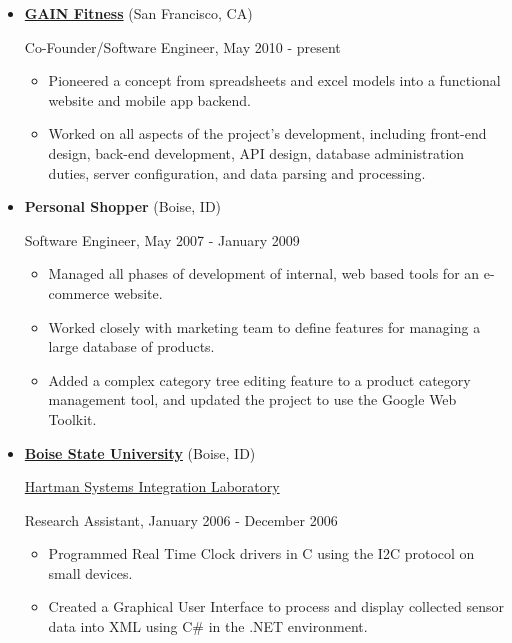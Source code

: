 \documentclass{article}
\begin{document}
\begin{itemize}%
\item \textbf{\href{http://gainfitness.com}{GAIN Fitness}} (San Francisco, CA)

Co-Founder/Software Engineer, May 2010 - present

\begin{itemize}%
\item Pioneered a concept from spreadsheets and excel models into a functional website and mobile app backend.
\item Worked on all aspects of the project’s development, including front-end design, back-end development, API design, database administration duties, server configuration, and data parsing and processing.

\end{itemize}


\end{itemize}
\begin{itemize}%
\item \textbf{Personal Shopper} (Boise, ID)

Software Engineer, May 2007 - January 2009

\begin{itemize}%
\item Managed all phases of development of internal, web based tools for an e-commerce website.
\item Worked closely with marketing team to define features for managing a large database of products.
\item Added a complex category tree editing feature to a product category management tool, and updated the project to use the Google Web Toolkit.

\end{itemize}


\end{itemize}
\begin{itemize}%
\item \textbf{\href{http://boisestate.edu/}{Boise State University}} (Boise, ID)

\href{http://coen.boisestate.edu/ece/hartman-systems-integration-laboratory/}{Hartman Systems Integration Laboratory}

Research Assistant, January 2006 - December 2006

\begin{itemize}%
\item Programmed Real Time Clock drivers in C using the I2C protocol on small devices.
\item Created a Graphical User Interface to process and display collected sensor data into XML using C# in the .NET environment.

\end{itemize}


\end{itemize}
\end{document}
